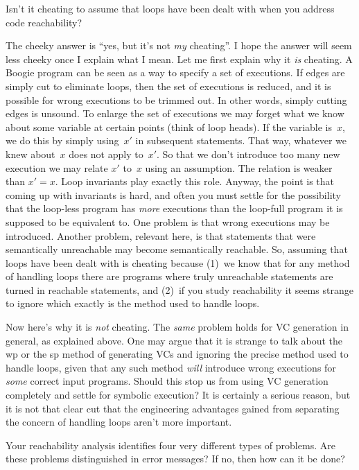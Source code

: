 \Q Isn't it cheating to assume that loops have been dealt with when you
address code reachability?

\A The cheeky answer is ``yes, but it's not {\it my\/} cheating''. I hope
the answer will seem less cheeky once I explain what I mean. Let me first
explain why it {\it is\/} cheating. A Boogie program can be seen as a way
to specify a set of executions. If edges are simply cut to eliminate loops,
then the set of executions is reduced, and it is possible for wrong
executions to be trimmed out. In other words, simply cutting edges is
unsound. To enlarge the set of executions we may forget what we know about
some variable at certain points (think of loop heads). If the variable
is~$x$, we do this by simply using~$x'$ in subsequent statements. That way,
whatever we knew about~$x$ does not apply to~$x'$. So that we don't
introduce too many new execution we may relate $x'$ to~$x$ using an
assumption. The relation is weaker than $x'=x$. Loop invariants play
exactly this role. Anyway, the point is that coming up with invariants is
hard, and often you must settle for the possibility that the loop-less
program has {\it more\/} executions than the loop-full program it is
supposed to be equivalent to. One problem is that wrong executions may be
introduced. Another problem, relevant here, is that statements that were
semantically unreachable may become semantically reachable.  So, assuming
that loops have been dealt with is cheating because (1)~we know that for
any method of handling loops there are programs where truly unreachable
statements are turned in reachable statements, and (2)~if you study
reachability it seems strange to ignore which exactly is the method used to
handle loops.

Now here's why it is {\it not\/} cheating. The {\it same\/} problem holds
for VC generation in general, as explained above. One may argue that it is
strange to talk about the wp or the sp method of generating VCs and
ignoring the precise method used to handle loops, given that any such
method {\it will\/} introduce wrong executions for {\it some\/} correct
input programs. Should this stop us from using VC generation completely and
settle for symbolic execution? It is certainly a serious reason, but it is
not that clear cut that the engineering advantages gained from separating
the concern of handling loops aren't more important.

\Q Your reachability analysis identifies four very different types of
problems.  Are these problems distinguished in error messages? If no, then
how can it be done?

